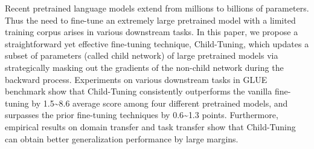 Recent pretrained language models extend from millions to billions of parameters. Thus the need to fine-tune an extremely large pretrained model with a limited training corpus arises in various downstream tasks. In this paper, we propose a straightforward yet effective fine-tuning technique, Child-Tuning, which updates a subset of parameters (called child network) of large pretrained models via strategically masking out the gradients of the non-child network during the backward process. Experiments on various downstream tasks in GLUE benchmark show that Child-Tuning consistently outperforms the vanilla fine-tuning by 1.5{\textasciitilde}8.6 average score among four different pretrained models, and surpasses the prior fine-tuning techniques by 0.6{\textasciitilde}1.3 points. Furthermore, empirical results on domain transfer and task transfer show that Child-Tuning can obtain better generalization performance by large margins.
